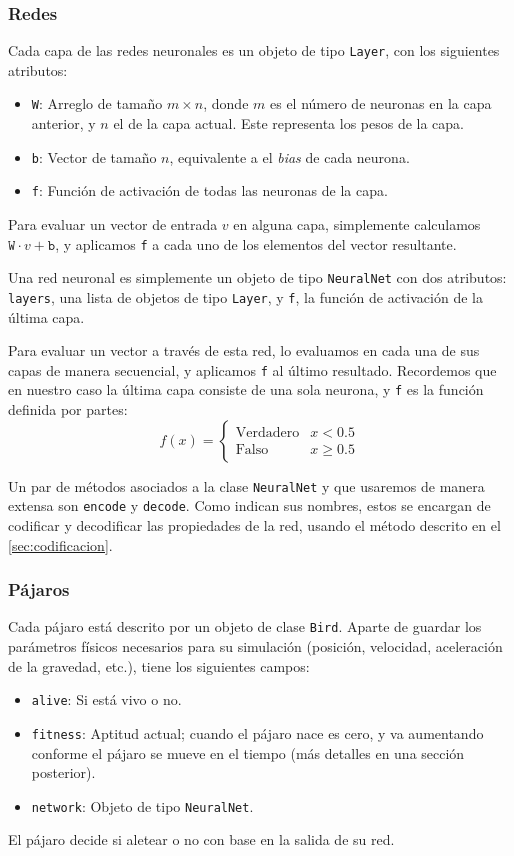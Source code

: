 \documentclass[twocolumn,spanish]{revtex4-1}
\begin{document}
\subsubsection{Redes}
Cada capa de las redes neuronales es un objeto de tipo \texttt{Layer}, con los siguientes atributos:
\begin{itemize}
    \item \texttt{W}: Arreglo de tamaño $m\times n$, donde $m$ es el número de neuronas en la capa anterior, y $n$ el de la capa actual. Este representa los pesos de la capa.
    \item \texttt{b}: Vector de tamaño $n$, equivalente a el \textit{bias} de cada neurona.
    \item \texttt{f}: Función de activación de todas las neuronas de la capa.
\end{itemize}
Para evaluar un vector de entrada $v$ en alguna capa, simplemente calculamos $\texttt{W}\cdot v + \texttt{b}$, y aplicamos \texttt{f} a cada uno de los elementos del vector resultante.

Una red neuronal es simplemente un objeto de tipo \texttt{NeuralNet} con dos atributos: \texttt{layers}, una lista de objetos de tipo \texttt{Layer}, y \texttt{f}, la función de activación de la última capa. 

Para evaluar un vector a través de esta red, lo evaluamos en cada una de sus capas de manera secuencial, y aplicamos \texttt{f} al último resultado. Recordemos que en nuestro caso la última capa consiste de una sola neurona, y \texttt{f} es la función definida por partes:
\begin{equation*}
    f(x)=
    \begin{cases}
     \text{Verdadero} & x < 0.5\\
     \text{Falso} & x\geq 0.5
    \end{cases}
\end{equation*}

Un par de métodos asociados a la clase \texttt{NeuralNet} y que usaremos de manera extensa son \texttt{encode} y \texttt{decode}. Como indican sus nombres, estos se encargan de codificar y decodificar las propiedades de la red, usando el método descrito en el \cref{sec:codificacion}.

\subsubsection{Pájaros}
Cada pájaro está descrito por un objeto de clase \texttt{Bird}. Aparte de guardar los parámetros físicos necesarios para su simulación (posición, velocidad, aceleración de la gravedad, etc.), tiene los siguientes campos:
\begin{itemize}
    \item \texttt{alive}: Si está vivo o no.
    \item \texttt{fitness}: Aptitud actual; cuando el pájaro nace es cero, y va aumentando conforme el pájaro se mueve en el tiempo (más detalles en una sección posterior).
    \item \texttt{network}: Objeto de tipo \texttt{NeuralNet}.
\end{itemize}
El pájaro decide si aletear o no con base en la salida de su red.
\end{document}
